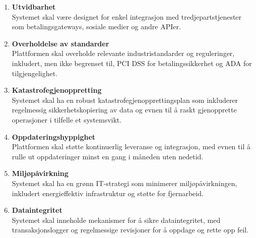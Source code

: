 \documentclass[../doc.tex]{subfiles}
\begin{document}
\begin{enumerate}
    \item \textbf{Utvidbarhet} \\
    Systemet skal være designet for enkel integrasjon med tredjepartstjenester som betalingsgateways, sosiale medier og andre APIer.

    \item \textbf{Overholdelse av standarder} \\
    Plattformen skal overholde relevante industristandarder og reguleringer, inkludert, men ikke begrenset til, PCI DSS for betalingssikkerhet og ADA for tilgjengelighet.

    \item \textbf{Katastrofegjenoppretting} \\
    Systemet skal ha en robust katastrofegjenopprettingsplan som inkluderer regelmessig sikkerhetskopiering av data og evnen til å raskt gjenopprette operasjoner i tilfelle et systemsvikt.

    \item \textbf{Oppdateringshyppighet} \\
    Plattformen skal støtte kontinuerlig leveranse og integrasjon, med evnen til å rulle ut oppdateringer minst en gang i måneden uten nedetid.

    \item \textbf{Miljøpåvirkning} \\
    Systemet skal ha en grønn IT-strategi som minimerer miljøpåvirkningen, inkludert energieffektiv infrastruktur og støtte for fjernarbeid.
    
    \item \textbf{Dataintegritet} \\
    Systemet skal inneholde mekanismer for å sikre dataintegritet, med transaksjonslogger og regelmessige revisjoner for å oppdage og rette opp feil.
\end{enumerate}
\end{document}
